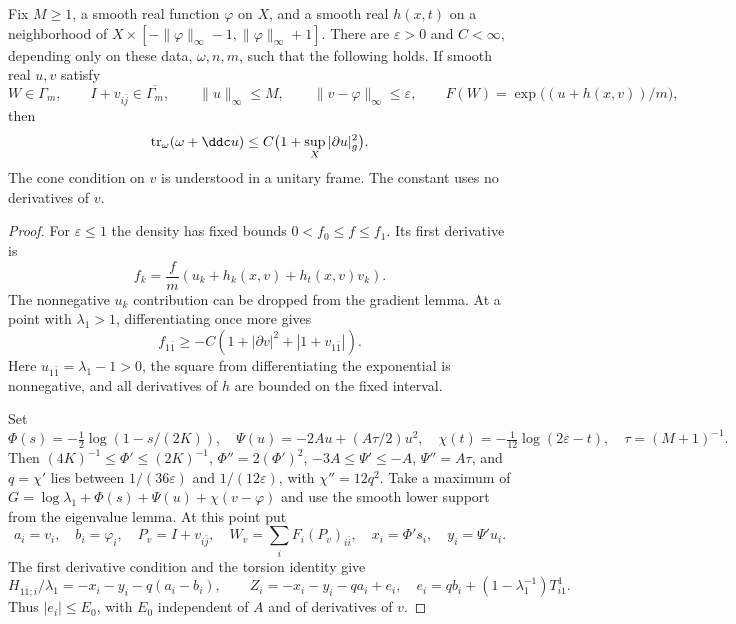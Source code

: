 \begin{proposition}\label{draft:600-prescribed-potential-trace}
Fix $M\geq1$, a smooth real function $\varphi$ on $X$, and a smooth real $h(x,t)$ on a neighborhood of $X\times[-\|\varphi\|_\infty-1,\|\varphi\|_\infty+1]$. There are $\varepsilon>0$ and $C<\infty$, depending only on these data, $\omega,n,m$, such that the following holds. If smooth real $u,v$ satisfy
\[
 W\in\Gamma_m,\qquad I+v_{i\bar j}\in\overline{\Gamma_m},\qquad
 \|u\|_\infty\leq M,\qquad\|v-\varphi\|_\infty\leq\varepsilon,
 \qquad F(W)=\exp\bigl((u+h(x,v))/m\bigr),
\]
then
\[
 \operatorname{tr}_\omega(\omega+\ddc u)
                  \leq C\bigl(1+\sup_X|\partial u|_g^2\bigr).
\]
The cone condition on $v$ is understood in a unitary frame. The constant uses no derivatives of $v$.
\end{proposition}
\begin{proof}
For $\varepsilon\leq1$ the density has fixed bounds $0<f_0\leq f\leq f_1$. Its first derivative is
\[
 f_k=\frac f m(u_k+h_k(x,v)+h_t(x,v)v_k).
\]
The nonnegative $u_k$ contribution can be dropped from the gradient lemma. At a point with $\lambda_1>1$, differentiating once more gives
\[
 f_{1\bar1}\geq-C(1+|\partial v|^2+|1+v_{1\bar1}|).
\]
Here $u_{1\bar1}=\lambda_1-1>0$, the square from differentiating the exponential is nonnegative, and all derivatives of $h$ are bounded on the fixed interval.

Set
\[
 \Phi(s)=-\tfrac12\log(1-s/(2K)),\quad
 \Psi(u)=-2Au+(A\tau/2)u^2,\quad
 \chi(t)=-\tfrac1{12}\log(2\varepsilon-t),\quad \tau=(M+1)^{-1}.
\]
Then $(4K)^{-1}\leq\Phi'\leq(2K)^{-1}$, $\Phi''=2(\Phi')^2$, $-3A\leq\Psi'\leq-A$, $\Psi''=A\tau$, and $q=\chi'$ lies between $1/(36\varepsilon)$ and $1/(12\varepsilon)$, with $\chi''=12q^2$.
Take a maximum of $G=\log\lambda_1+\Phi(s)+\Psi(u)+\chi(v-\varphi)$ and use the smooth lower support from the eigenvalue lemma. At this point put
\[
 a_i=v_i,\quad b_i=\varphi_i,\quad P_v=I+v_{i\bar j},\quad
 W_v=\sum_iF_i(P_v)_{i\bar i},\quad
 x_i=\Phi's_i,\quad y_i=\Psi'u_i.
\]
The first derivative condition and the torsion identity give
\[
 H_{1\bar1;i}/\lambda_1=-x_i-y_i-q(a_i-b_i),\qquad
 Z_i=-x_i-y_i-qa_i+e_i,\quad
 e_i=qb_i+(1-\lambda_1^{-1})T^1_{i1}.
\]
Thus $|e_i|\leq E_0$, with $E_0$ independent of $A$ and of derivatives of $v$.


\end{proof}
